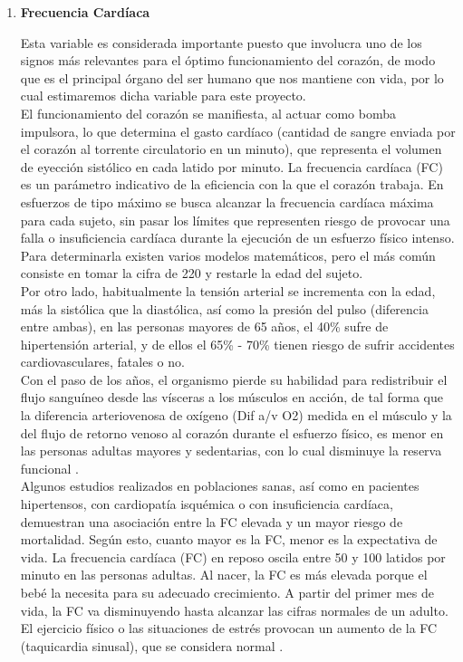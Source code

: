 \begin{enumerate}
	\item \textbf{Frecuencia Cardíaca}
	
	Esta variable es considerada importante puesto que involucra uno de los signos más relevantes para el óptimo funcionamiento del corazón, de modo que es el principal órgano del ser humano que nos mantiene con vida, por lo cual estimaremos dicha variable para este proyecto. \\
	
	El funcionamiento del corazón se manifiesta, al actuar como bomba impulsora, lo que determina el gasto cardíaco (cantidad de sangre enviada por el corazón al torrente circulatorio en un minuto), que representa el volumen de eyección sistólico en cada latido por minuto. La frecuencia cardíaca (FC) es un parámetro indicativo de la eficiencia con la que el corazón trabaja. En esfuerzos de tipo máximo se busca alcanzar la frecuencia cardíaca máxima para cada sujeto, sin pasar los límites que representen riesgo de provocar una falla o insuficiencia cardíaca durante la ejecución de un esfuerzo físico intenso. Para determinarla existen varios modelos matemáticos, pero el más común consiste en tomar la cifra de 220 y restarle la edad del sujeto. \\
	
	Por otro lado, habitualmente la tensión arterial se incrementa con la edad, más la sistólica que la diastólica, así como la presión del pulso (diferencia entre ambas), en las personas mayores de 65 años, el 40\% sufre de hipertensión arterial, y de ellos el 65\% - 70\% tienen riesgo de sufrir accidentes cardiovasculares, fatales o no. \\
	
	Con el paso de los años, el organismo pierde su habilidad para redistribuir el flujo sanguíneo desde las vísceras a los músculos en acción, de tal forma que la diferencia arteriovenosa de oxígeno (Dif a/v O2) medida en el músculo y la del flujo de retorno venoso al corazón durante el esfuerzo físico, es menor en las personas adultas mayores y sedentarias, con lo cual disminuye la reserva funcional \cite{catorce}. \\
	
	Algunos estudios realizados en poblaciones sanas, así como en pacientes hipertensos, con cardiopatía isquémica o con insuficiencia cardíaca, demuestran una asociación entre la FC elevada y un mayor riesgo de mortalidad. Según esto, cuanto mayor es la FC, menor es la expectativa de vida. La frecuencia cardíaca (FC) en reposo oscila entre 50 y 100 latidos por minuto en las personas adultas. Al nacer, la FC es más elevada porque el bebé la necesita para su adecuado crecimiento. A partir del primer mes de vida, la FC va disminuyendo hasta alcanzar las cifras normales de un adulto. El ejercicio físico o las situaciones de estrés provocan un aumento de la FC (taquicardia sinusal), que se considera normal \cite{quince}.
	
\end{enumerate}

